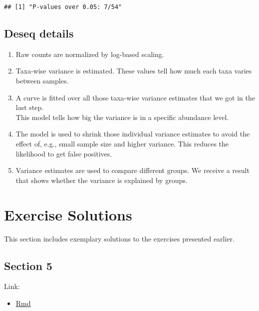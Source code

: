 \documentclass[
  oneside]{book}
\providecommand{\tightlist}{%
  \setlength{\itemsep}{0pt}\setlength{\parskip}{0pt}}
\begin{document}
\begin{verbatim}
## [1] "P-values over 0.05: 7/54"
\end{verbatim}

\hypertarget{deseq-details}{%
\section{Deseq details}\label{deseq-details}}

\begin{enumerate}
\def\labelenumi{\arabic{enumi}.}
\tightlist
\item
  Raw counts are normalized by log-based scaling.\\
\item
  Taxa-wise variance is estimated. These values tell how much each taxa varies between samples.\\
\item
  A curve is fitted over all those taxa-wise variance estimates that we got in the last step.\\
  This model tells how big the variance is in a specific abundance level.
\item
  The model is used to shrink those individual variance estimates to avoid the effect of,
  e.g., small sample size and higher variance. This reduces the likelihood to get
  false positives.\\
\item
  Variance estimates are used to compare different groups. We receive a result that shows whether the variance is explained by groups.
\end{enumerate}

\hypertarget{exercise-solutions}{%
\chapter{Exercise Solutions}\label{exercise-solutions}}

This section includes exemplary solutions to the exercises presented earlier.

\hypertarget{section-5}{%
\section{Section 5}\label{section-5}}

Link:

\begin{itemize}
\tightlist
\item
  \href{import.Rmd}{Rmd}
\end{itemize}
\end{document}
